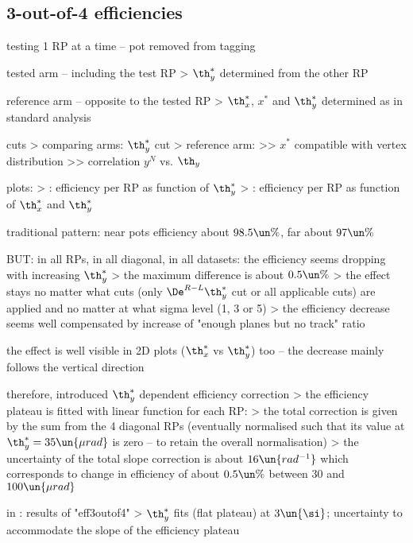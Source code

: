\subsection{3-out-of-4 efficiencies}

\> testing 1 RP at a time -- pot removed from tagging

\> tested arm -- including the test RP
\>> $\th_y^*$ determined from the other RP

\> reference arm -- opposite to the tested RP
\>> $\th_x^*$, $x^*$ and $\th_y^*$ determined as in standard analysis

\> cuts
\>> comparing arms: $\th_y^*$ cut
\>> reference arm:
\>>> $x^*$ compatible with vertex distribution
\>>> correlation $y^N$ vs. $\th_y$


\> plots:
\>>  : efficiency per RP as function of $\th_y^*$
\>>  : efficiency per RP as function of $\th_x^*$ and $\th_y^*$

\> traditional pattern: near pots efficiency about $98.5\un{\%}$, far about $97\un{\%}$

\> BUT: in all RPs, in all diagonal, in all datasets: the efficiency seems dropping with increasing $\th_y^*$
\>> the maximum difference is about $0.5\un{\%}$
\>> the effect stays no matter what cuts (only $\De^{R-L}\th_y^*$ cut or all applicable cuts) are applied
and no matter at what sigma level (1, 3 or 5)
\>> the efficiency decrease seems well compensated by increase of "enough planes but no track" ratio

\> the effect is well visible in 2D plots ($\th_x^*$ vs $\th_y^*$) too -- the decrease mainly follows the vertical direction

\> therefore, introduced $\th_y^*$ dependent efficiency correction
\>> the efficiency plateau is fitted with linear function for each RP: 
\>> the total correction is given by the sum from the 4 diagonal RPs (eventually normalised such that its value at
$\th_y^* = 35\un{\mu rad}$ is zero -- to retain the overall normalisation)
\>> the uncertainty of the total slope correction is about $16\un{rad^{-1}}$ which corresponds to change in efficiency
of about $0.5\un{\%}$ between $30$ and $100\un{\mu rad}$

\> in : results of "eff3outof4"
\>> $\th_y^*$ fits (flat plateau) at $3\un{\si}$; uncertainty to accommodate the slope of the efficiency plateau


